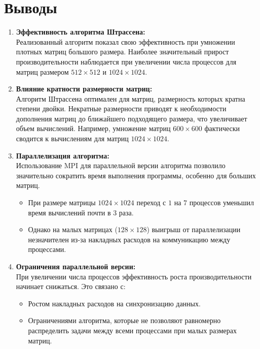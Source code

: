 \documentclass[a4paper, 14pt]{extarticle}
\begin{document}
    \section{Выводы}
\begin{enumerate}
\item \textbf{Эффективность алгоритма Штрассена:}  \\
   Реализованный алгоритм показал свою эффективность при умножении плотных матриц большого размера. Наиболее значительный прирост производительности наблюдается при увеличении числа процессов для матриц размером \(512 \times 512\) и \(1024 \times 1024\).

\item \textbf{Влияние кратности размерности матриц:} \\ 
   Алгоритм Штрассена оптимален для матриц, размерность которых кратна степени двойки. Некратные размерности приводят к необходимости дополнения матриц до ближайшего подходящего размера, что увеличивает объем вычислений. Например, умножение матриц \(600 \times 600\) фактически сводится к вычислениям для матриц \(1024 \times 1024\).

\item \textbf{Параллелизация алгоритма:}  \\
   Использование MPI для параллельной версии алгоритма позволило значительно сократить время выполнения программы, особенно для больших матриц.  
   \begin{itemize}
       \item При размере матрицы \(1024 \times 1024\) переход с \(1\) на \(7\) процессов уменьшил время вычислений почти в \(3\) раза.
       \item Однако на малых матрицах (\(128 \times 128\)) выигрыш от параллелизации незначителен из-за накладных расходов на коммуникацию между процессами.
   \end{itemize}

\item \textbf{Ограничения параллельной версии:}  \\
   При увеличении числа процессов эффективность роста производительности начинает снижаться. Это связано с:
   \begin{itemize}
       \item Ростом накладных расходов на синхронизацию данных.
       \item Ограничениями алгоритма, которые не позволяют равномерно распределить задачи между всеми процессами при малых размерах матриц.
   \end{itemize}
\end{enumerate}
\end{document}
